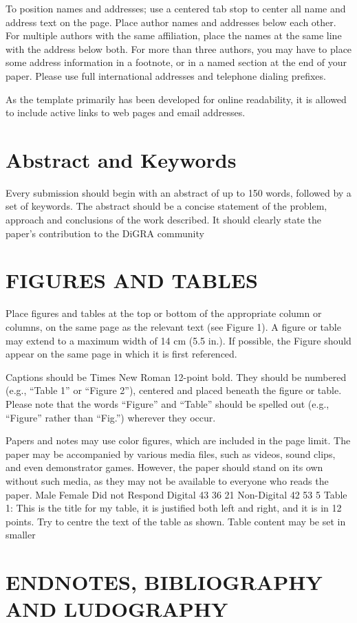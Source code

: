 \documentclass[11pt]{article}
\begin{document}
To position names and addresses; use a centered tab stop to center all name and address
text on the page. Place author names and addresses below each other. For multiple
authors with the same affiliation, place the names at the same line with the address below
both. For more than three authors, you may have to place some address information in a
footnote, or in a named section at the end of your paper. Please use full international
addresses and telephone dialing prefixes.

As the template primarily has been developed for online readability, it is allowed to
include active links to web pages and email addresses.
\section*{Abstract and Keywords}
Every submission should begin with an abstract of up to 150 words, followed by a set of
keywords. The abstract should be a concise statement of the problem, approach and
conclusions of the work described. It should clearly state the paper's contribution to the
DiGRA community
\section*{FIGURES AND TABLES}
Place figures and tables at the top or bottom of the appropriate column or columns, on the
same page as the relevant text (see Figure 1). A figure or table may extend to a maximum
width of 14 cm (5.5 in.). If possible, the Figure should appear on the same page in which
it is first referenced.

Captions should be Times New Roman 12-point bold. They should be numbered (e.g.,
“Table 1” or “Figure 2”), centered and placed beneath the figure or table. Please note that
the words “Figure” and “Table” should be spelled out (e.g., “Figure” rather than “Fig.”)
wherever they occur.

Papers and notes may use color figures, which are included in the page limit. The paper
may be accompanied by various media files, such as videos, sound clips, and even
demonstrator games. However, the paper should stand on its own without such media, as
they may not be available to everyone who reads the paper.
Male Female Did not Respond
Digital 43 36 21
Non-Digital 42 53 5
Table 1: This is the title for my table, it is justified both left and right, and it is in 12
points. Try to centre the text of the table as shown. Table content may be set in smaller

\section*{ENDNOTES, BIBLIOGRAPHY AND LUDOGRAPHY}
\end{document}
